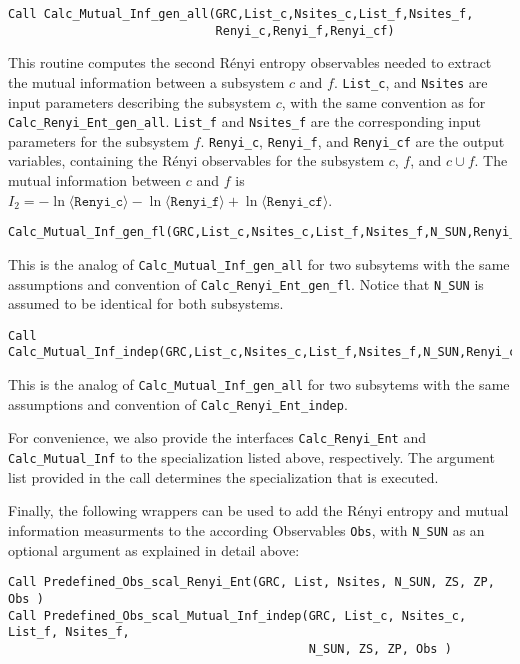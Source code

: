 \begin{lstlisting}[style=fortran]
Call Calc_Mutual_Inf_gen_all(GRC,List_c,Nsites_c,List_f,Nsites_f,
                             Renyi_c,Renyi_f,Renyi_cf)
\end{lstlisting}
This routine computes the second R\'enyi entropy observables needed to extract the mutual information between a subsystem $c$ and $f$. \texttt{List\_c}, and \texttt{Nsites} are input parameters describing the subsystem $c$, with the same convention as for \texttt{Calc\_Renyi\_Ent\_gen\_all}. \texttt{List\_f} and \texttt{Nsites\_f} are the corresponding input parameters for the subsystem $f$. \texttt{Renyi\_c}, \texttt{Renyi\_f}, and \texttt{Renyi\_cf} are the output variables, containing the R\'enyi observables for the subsystem $c$, $f$, and $c\cup f$. The mutual information between $c$ and $f$ is $I_2=-\ln \langle \texttt{Renyi\_c}\rangle -\ln \langle \texttt{Renyi\_f}\rangle +\ln \langle \texttt{Renyi\_cf}\rangle$.

\begin{lstlisting}[style=fortran,breaklines=true]
Calc_Mutual_Inf_gen_fl(GRC,List_c,Nsites_c,List_f,Nsites_f,N_SUN,Renyi_c,Renyi_f,Renyi_cf)
\end{lstlisting}
This is the analog of \texttt{Calc\_Mutual\_Inf\_gen\_all} for two subsytems with the same assumptions and convention of \texttt{Calc\_Renyi\_Ent\_gen\_fl}. Notice that \texttt{N_SUN} is assumed to be identical for both subsystems.

\begin{lstlisting}[style=fortran,breaklines=true]
Call Calc_Mutual_Inf_indep(GRC,List_c,Nsites_c,List_f,Nsites_f,N_SUN,Renyi_c,Renyi_f,Renyi_cf)
\end{lstlisting}
This is the analog of \texttt{Calc\_Mutual\_Inf\_gen\_all} for two subsytems with the same assumptions and convention of \texttt{Calc\_Renyi\_Ent\_indep}.

For convenience, we also provide the interfaces \texttt{Calc\_Renyi\_Ent} and \texttt{Calc\_Mutual\_Inf} to the specialization listed above, respectively. The argument list provided in the call determines the specialization that is executed.

Finally, the following wrappers can be used to add the R{\'e}nyi entropy and mutual information measurments to the according Observables \texttt{Obs}, with \texttt{N\_SUN} as an optional argument as explained in detail above:
\begin{lstlisting}[style=fortran,breaklines=true]
Call Predefined_Obs_scal_Renyi_Ent(GRC, List, Nsites, N_SUN, ZS, ZP, Obs )
Call Predefined_Obs_scal_Mutual_Inf_indep(GRC, List_c, Nsites_c, List_f, Nsites_f,
                                          N_SUN, ZS, ZP, Obs )
\end{lstlisting}
